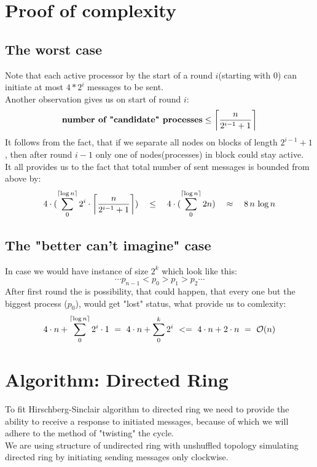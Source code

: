 \documentclass{article}
\DeclarePairedDelimiter\ceil{\lceil}{\rceil}
\begin{document}
\section*{Proof of complexity}
\subsection*{The worst case}
   Note that each active processor by the start of a round $i$(starting with 0) can initiate at most $4*2^i$ messages to be sent. \\
   Another observation gives us on start of round $i$:
   \begin{equation}
   \textbf{number of "candidate" processes} \leq \ceil*{\frac{n}{2^{i-1} + 1}}
   \end{equation}
   It follows from the fact, that if we separate all nodes on blocks of length $2^{i-1} + 1$, then after round $i-1$ only one of nodes(processes) in block could stay active.\\

   \bigskip
   \noindent
   It all provides us to the fact that total number of sent messages is bounded from above by:
   \begin{equation}
   4\cdot(\sum_0^{\ceil*{\log n}} 2^i \cdot \ceil*{\frac{n}{2^{i-1} + 1}})
   \quad\leq\quad 4\cdot(\sum_0^{\ceil{\log n}} 2n) \quad \approx \quad 8\, n \,\log n
   \end{equation}
  \subsection*{The "better can't imagine" case}
    In case we would have instance of size $2^k$ which look like this:
    \begin{equation}
    \cdots p_{n-1} < p_0 > p_1 > p_2 \cdots
    \end{equation}
    After first round the is possibility, that could happen, that every one but the biggest process ($p_0$), would get "lost" status, what provide us to comlexity:
    \begin{equation}
    4\cdot n + \sum_0^{\ceil*{\log n}} 2^i \cdot 1 \,\,= \,\,
    4\cdot n + \sum_0^{k} 2^i
    \,\, <= \,\,
    4\cdot n + 2 \cdot n\,\, = \,\,\mathcal{O}(n)
    \end{equation}
\bigskip

\section*{Algorithm: Directed Ring}
To fit Hirschberg-Sinclair algorithm to directed ring we need to provide the ability to receive a response to initiated messages, because of which we will adhere to the method of "twisting" the cycle. \\
We are using structure of undirected ring with unshuffled topology simulating directed ring by initiating sending messages only clockwise.\\
\end{document}
